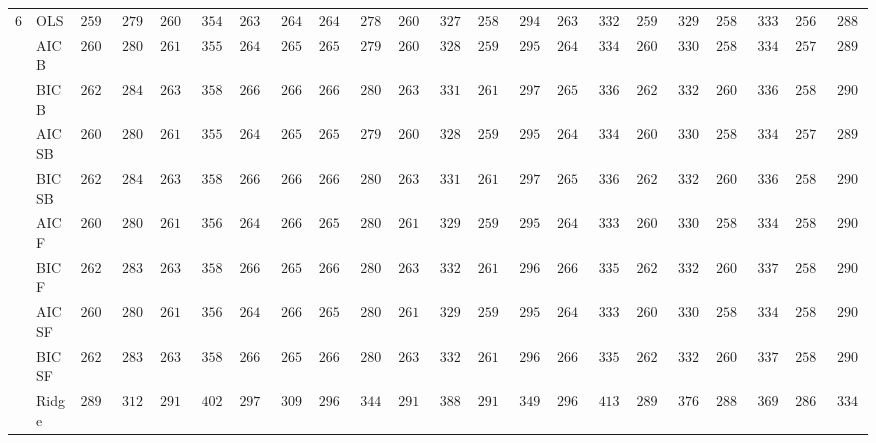 \begin{tabular}{ll|ll|llllll|llllll|llllll}
6 & OLS  & $2599.03$ & $279.57$ & $2604.76$ & $354.27$ & $2639.54$ & $264.18$ & $2646.01$ & $278.43$ & $2600.65$ & $327.25$ & $2585.46$ & $294.91$ & $2637.03$ & $332.73$ & $2592.98$ & $329.31$ & $2580.37$ & $333.81$ & $2569.83$ & $288.75$ \\
 & AIC B  & $2607.71$ & $280.16$ & $2614.22$ & $355.52$ & $2648.47$ & $265.41$ & $2655.37$ & $279.76$ & $2609.59$ & $328.57$ & $2594.10$ & $295.58$ & $2645.77$ & $334.14$ & $2602.01$ & $330.57$ & $2588.92$ & $334.77$ & $2578.21$ & $289.28$ \\
 & BIC B  & $2627.22$ & $284.50$ & $2631.19$ & $358.98$ & $2665.70$ & $266.20$ & $2669.75$ & $280.79$ & $2630.36$ & $331.72$ & $2612.16$ & $297.16$ & $2659.97$ & $336.50$ & $2621.06$ & $332.75$ & $2604.95$ & $336.31$ & $2589.61$ & $290.71$ \\
 & AIC SB  & $2607.71$ & $280.16$ & $2614.22$ & $355.52$ & $2648.47$ & $265.41$ & $2655.37$ & $279.76$ & $2609.59$ & $328.57$ & $2594.10$ & $295.58$ & $2645.77$ & $334.14$ & $2602.01$ & $330.57$ & $2588.92$ & $334.77$ & $2578.21$ & $289.28$ \\
 & BIC SB  & $2627.22$ & $284.50$ & $2631.19$ & $358.98$ & $2665.70$ & $266.20$ & $2669.75$ & $280.79$ & $2630.36$ & $331.72$ & $2612.16$ & $297.16$ & $2659.97$ & $336.50$ & $2621.06$ & $332.75$ & $2604.95$ & $336.31$ & $2589.61$ & $290.71$ \\
 & AIC F  & $2607.82$ & $280.27$ & $2614.72$ & $356.13$ & $2649.94$ & $266.07$ & $2657.80$ & $280.68$ & $2610.04$ & $329.03$ & $2595.50$ & $295.85$ & $2649.72$ & $333.83$ & $2602.34$ & $330.56$ & $2589.92$ & $334.98$ & $2580.08$ & $290.02$ \\
 & BIC F  & $2627.49$ & $283.86$ & $2631.19$ & $358.98$ & $2666.01$ & $265.94$ & $2669.75$ & $280.79$ & $2631.15$ & $332.26$ & $2612.39$ & $296.99$ & $2660.21$ & $335.28$ & $2621.06$ & $332.75$ & $2606.21$ & $337.87$ & $2589.59$ & $290.70$ \\
 & AIC SF  & $2607.82$ & $280.27$ & $2614.72$ & $356.13$ & $2649.94$ & $266.07$ & $2657.80$ & $280.68$ & $2610.04$ & $329.03$ & $2595.54$ & $295.78$ & $2649.72$ & $333.83$ & $2602.34$ & $330.56$ & $2589.92$ & $334.98$ & $2580.08$ & $290.02$ \\
 & BIC SF  & $2627.49$ & $283.86$ & $2631.19$ & $358.98$ & $2666.01$ & $265.94$ & $2669.75$ & $280.79$ & $2631.15$ & $332.26$ & $2612.39$ & $296.99$ & $2660.50$ & $335.73$ & $2621.06$ & $332.75$ & $2606.21$ & $337.87$ & $2589.59$ & $290.70$ \\
 & Ridge  & $2899.43$ & $312.70$ & $2915.72$ & $402.81$ & $2972.46$ & $309.91$ & $2968.64$ & $344.62$ & $2912.15$ & $388.88$ & $2912.24$ & $349.42$ & $2964.82$ & $413.08$ & $2895.37$ & $376.78$ & $2887.22$ & $369.96$ & $2867.19$ & $334.43$ \\

\end{tabular}
